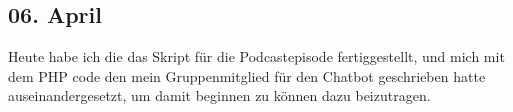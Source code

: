 \subsection{06. April}
Heute habe ich die das Skript für die Podcastepisode fertiggestellt, und mich mit dem PHP code den mein Gruppenmitglied für den Chatbot geschrieben hatte auseinandergesetzt, um damit beginnen zu können dazu beizutragen.